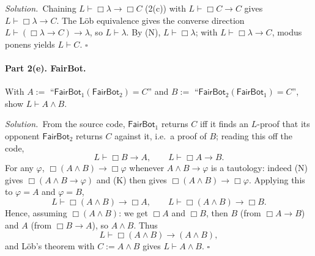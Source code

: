 \documentclass[11pt]{article}
\newcommand{\proves}{\vdash}
\newcommand{\FB}{\mathsf{FairBot}}
\newcommand{\bx}{\Box}
\newcommand{\soln}{\medskip\noindent\textit{Solution.}\ }
\renewcommand{\qed}{\ensuremath{\square}}
\begin{document}
\begin{solution}[ex:lob]
\soln Chaining $L\proves\bx\lambda\to\bx C$ (2(c)) with $L\proves\bx C\to C$ gives $L\proves\bx\lambda\to C$. The L\"ob equivalence gives the converse direction $L\proves(\bx\lambda\to C)\to\lambda$, so $L\proves\lambda$. By (N), $L\proves\bx\lambda$; with $L\proves\bx\lambda\to C$, modus ponens yields $L\proves C$. \qed

\paragraph{Part 2(e). FairBot.} With $A:=$ ``$\FB_1(\FB_2)=C$'' and $B:=$ ``$\FB_2(\FB_1)=C$'', show $L\proves A\wedge B$.

\soln From the source code, $\FB_1$ returns $C$ iff it finds an $L$-proof that its opponent $\FB_2$ returns $C$ against it, i.e.\ a proof of $B$; reading this off the code,
\[
  L\proves \bx B\to A,\qquad L\proves \bx A\to B .
\]
For any $\varphi$, $\bx(A\wedge B)\to\bx\varphi$ whenever $A\wedge B\to\varphi$ is a tautology: indeed (N) gives $\bx(A\wedge B\to\varphi)$ and (K) then gives $\bx(A\wedge B)\to\bx\varphi$. Applying this to $\varphi=A$ and $\varphi=B$,
\[
  L\proves \bx(A\wedge B)\to\bx A,\qquad L\proves \bx(A\wedge B)\to\bx B.
\]
Hence, assuming $\bx(A\wedge B)$: we get $\bx A$ and $\bx B$, then $B$ (from $\bx A\to B$) and $A$ (from $\bx B\to A$), so $A\wedge B$. Thus
\[
  L\proves \bx(A\wedge B)\to(A\wedge B),
\]
and L\"ob's theorem with $C:=A\wedge B$ gives $L\proves A\wedge B$. \qed
\end{solution}
\end{document}

